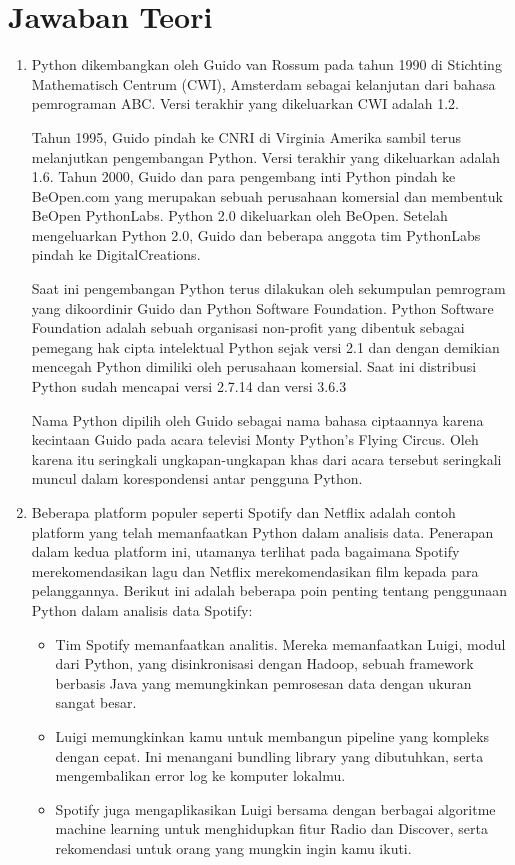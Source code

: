 \section{Jawaban Teori}
\begin{enumerate}
    \item Python dikembangkan oleh Guido van Rossum pada tahun 1990 di Stichting Mathematisch Centrum (CWI), Amsterdam sebagai kelanjutan dari bahasa pemrograman ABC. Versi terakhir yang dikeluarkan CWI adalah 1.2.
    \par
    Tahun 1995, Guido pindah ke CNRI di Virginia Amerika sambil terus melanjutkan pengembangan Python. Versi terakhir yang dikeluarkan adalah 1.6. Tahun 2000, Guido dan para pengembang inti Python pindah ke BeOpen.com yang merupakan sebuah perusahaan komersial dan membentuk BeOpen PythonLabs. Python 2.0 dikeluarkan oleh BeOpen. Setelah mengeluarkan Python 2.0, Guido dan beberapa anggota tim PythonLabs pindah ke DigitalCreations.
    \par
    Saat ini pengembangan Python terus dilakukan oleh sekumpulan pemrogram yang dikoordinir Guido dan Python Software Foundation. Python Software Foundation adalah sebuah organisasi non-profit yang dibentuk sebagai pemegang hak cipta intelektual Python sejak versi 2.1 dan dengan demikian mencegah Python dimiliki oleh perusahaan komersial. Saat ini distribusi Python sudah mencapai versi 2.7.14 dan versi 3.6.3
    \par
    Nama Python dipilih oleh Guido sebagai nama bahasa ciptaannya karena kecintaan Guido pada acara televisi Monty Python's Flying Circus. Oleh karena itu seringkali ungkapan-ungkapan khas dari acara tersebut seringkali muncul dalam korespondensi antar pengguna Python.
    \item Beberapa platform populer seperti Spotify dan Netflix adalah contoh platform yang telah memanfaatkan Python dalam analisis data. Penerapan dalam kedua platform ini, utamanya terlihat pada bagaimana Spotify merekomendasikan lagu dan Netflix merekomendasikan film kepada para pelanggannya. Berikut ini adalah beberapa poin penting tentang penggunaan Python dalam analisis data Spotify:
    \par
    \begin{itemize}
        \item Tim Spotify memanfaatkan analitis. Mereka memanfaatkan Luigi, modul dari Python, yang disinkronisasi dengan Hadoop, sebuah framework berbasis Java yang memungkinkan pemrosesan data dengan ukuran sangat besar.
        \item Luigi memungkinkan kamu untuk membangun pipeline yang kompleks dengan cepat. Ini menangani bundling library yang dibutuhkan, serta mengembalikan error log ke komputer lokalmu.
        \item Spotify juga mengaplikasikan Luigi bersama dengan berbagai algoritme machine learning untuk menghidupkan fitur Radio dan Discover, serta rekomendasi untuk orang yang mungkin ingin kamu ikuti.
    \end{itemize}
\end{enumerate}

